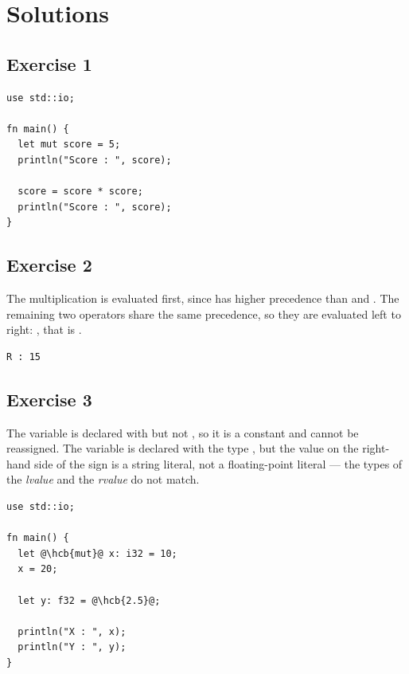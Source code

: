 \vfill%
\pagebreak

\forceevenpage{}

\section*{Solutions}
%
\subsection*{Exercise 1}

\begin{lstlisting}[style=coloredverbatim, caption=Solution for exercise 1]
use std::io;

fn main() {
  let mut score = 5;
  println("Score : ", score);

  score = score * score;
  println("Score : ", score);
}
\end{lstlisting}

\subsection*{Exercise 2}

The multiplication  is evaluated first, since \token{*} has
higher precedence than \token{+} and \token{-}. The remaining two operators
share the same precedence, so they are evaluated left to right:
, that is .

\begin{lstlisting}[style=bashVerb]
R : 15
\end{lstlisting}

\subsection*{Exercise 3}

The variable  is declared with  but not ,
so it is a constant and cannot be reassigned. The variable  is
declared with the type , but the value on the right-hand side of
the \token{=} sign is a string literal, not a floating-point literal — the
types of the \textit{lvalue} and the \textit{rvalue} do not match.

\begin{lstlisting}[style=coloredverbatim, escapechar=@, caption=Solution for exercise 3]
use std::io;

fn main() {
  let @\hcb{mut}@ x: i32 = 10;
  x = 20;

  let y: f32 = @\hcb{2.5}@;

  println("X : ", x);
  println("Y : ", y);
}
\end{lstlisting}


